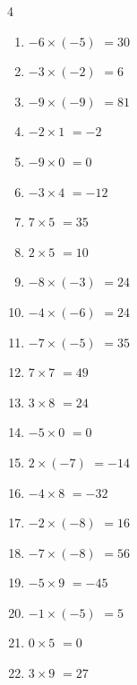 \begin{multicols}{4}
\begin{enumerate}
  \item $-6\times (-5)$
        $=30$

  \item $-3\times (-2)$
        $=6$

  \item $-9\times (-9)$
        $=81$

  \item $-2\times 1$
        $=-2$

  \item $-9\times 0$
        $=0$

  \item $-3\times 4$
        $=-12$

  \item $7\times 5$
        $=35$

  \item $2\times 5$
        $=10$

  \item $-8\times (-3)$
        $=24$

  \item $-4\times (-6)$
        $=24$

  \item $-7\times (-5)$
        $=35$

  \item $7\times 7$
        $=49$

  \item $3\times 8$
        $=24$

  \item $-5\times 0$
        $=0$

  \item $2\times (-7)$
        $=-14$

  \item $-4\times 8$
        $=-32$

  \item $-2\times (-8)$
        $=16$

  \item $-7\times (-8)$
        $=56$

  \item $-5\times 9$
        $=-45$

  \item $-1\times (-5)$
        $=5$

\columnbreak %

  \item $0\times 5$
        $=0$

  \item $3\times 9$
        $=27$


\end{enumerate}
\end{multicols}
